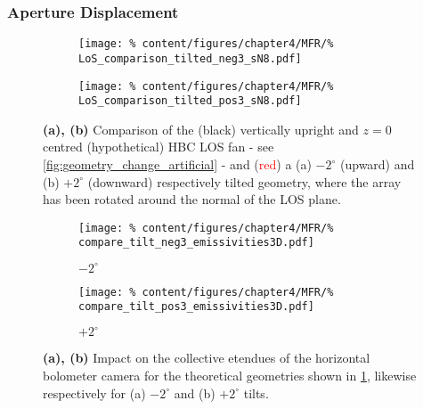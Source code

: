         \subsubsection*{Aperture Displacement}%
%
            \begin{figure}[t]%
                \centering%
                \begin{subfigure}{0.3\textwidth}%
                    \texttt{[image: \%
                        content/figures/chapter4/MFR/\%
                        LoS\_comparison\_tilted\_neg3\_sN8.pdf]}%
                    \caption{}%
                \end{subfigure}%
                \hspace*{0.5cm}%
                \begin{subfigure}{0.3\textwidth}%
                    \texttt{[image: \%
                        content/figures/chapter4/MFR/\%
                        LoS\_comparison\_tilted\_pos3\_sN8.pdf]}%
                    \caption{}%
                \end{subfigure}%
                \caption{\textbf{(a), (b)} Comparison of the (black) vertically upright and $z=0$ centred (hypothetical) HBC LOS fan - see \cref{fig:geometry_change_artificial} - and (\textcolor{red}{red}) a (a) $-2^{\circ}$ (upward) and (b) $+2^{\circ}$ (downward) respectively tilted geometry, where the array has been rotated around the normal of the LOS plane.}\label{fig:geometry_change_tilted}%
            \end{figure}%
%
            \begin{figure}[t]%
                \centering%
                \begin{subfigure}{0.47\textwidth}%
                    \texttt{[image: \%
                        content/figures/chapter4/MFR/\%
                        compare\_tilt\_neg3\_emissivities3D.pdf]}%
                    \caption{$-2^{\circ}$}%
                \end{subfigure}%
                \hfill%
                \begin{subfigure}{0.47\textwidth}%
                    \texttt{[image: \%
                        content/figures/chapter4/MFR/\%
                        compare\_tilt\_pos3\_emissivities3D.pdf]}%
                    \caption{$+2^{\circ}$}%
                \end{subfigure}%
                \caption{\textbf{(a), (b)} Impact on the collective etendues of the horizontal bolometer camera for the theoretical geometries shown in \cref{fig:geometry_change_tilted}, likewise respectively for (a) $-2^{\circ}$ and (b) $+2^{\circ}$ tilts.}\label{fig:emiss_change_tilted}%
            \end{figure}%
